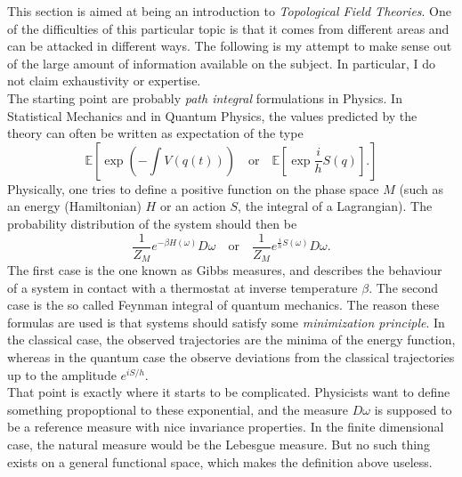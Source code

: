 This section is aimed at being an introduction to \textit{Topological Field Theories}. One of the difficulties of this particular topic is that it comes from different areas and can be attacked in different ways. The following is my attempt to make sense out of the large amount of information available on the subject. In particular, I do not claim exhaustivity or expertise.\\

The starting point are probably \textit{path integral} formulations in Physics. In Statistical Mechanics and in Quantum Physics, the values predicted by the theory can often be written as expectation of the type
\[\mathbb E[\exp (-\int V(q(t))) \quad \text{or} \quad \mathbb E [\exp \frac{i}{h} S(q)] .]\]
Physically, one tries to define a positive function on the phase space $M$ (such as an energy (Hamiltonian) $H$ or an action $S$, the integral of a Lagrangian). The probability distribution of the system should then be
\[\frac{1}{Z_M}e^{-\beta H(\omega)} D\omega \quad \text{or}\quad \frac{1}{Z_M}e^{\frac{i}{h}S(\omega)} D\omega .\]
The first case is the one known as Gibbs measures, and describes the behaviour of a system in contact with a thermostat at inverse temperature $\beta$. The second case is the so called Feynman integral of quantum mechanics. The reason these formulas are used is that systems should satisfy some \textit{minimization principle}. In the classical case, the observed trajectories are the minima of the energy function, whereas in the quantum case the observe deviations from the classical trajectories up to the amplitude $e^{iS/h}$.\\ 

That point is exactly where it starts to be complicated. Physicists want to define something propoptional to these exponential, and the measure $D\omega$ is supposed to be a reference measure with nice invariance properties. In the finite dimensional case, the natural measure would be the Lebesgue measure. But no such thing exists on a general functional space, which makes the definition above useless.\\  

